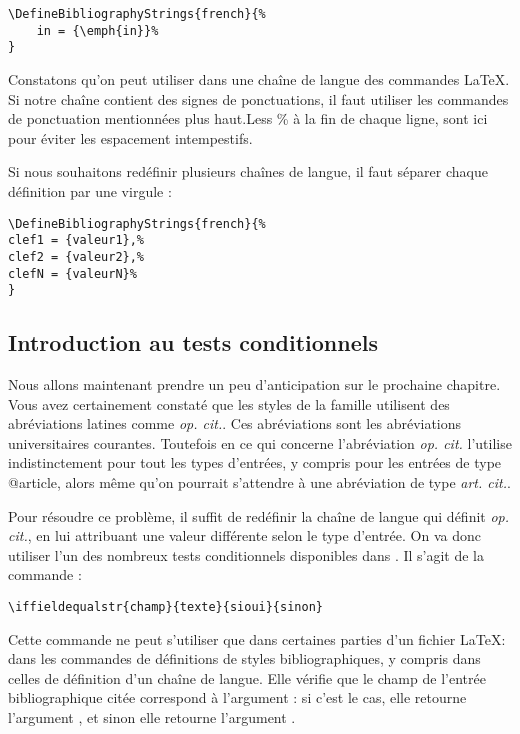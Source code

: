 	\begin{verbatim}
\DefineBibliographyStrings{french}{%
	in = {\emph{in}}%
}
	\end{verbatim}
	
	Constatons qu'on peut utiliser dans une chaîne de langue des commandes \LaTeX. Si notre chaîne contient des signes de ponctuations, il faut utiliser les commandes de ponctuation mentionnées plus haut.Less \% à la fin de chaque ligne, sont ici pour éviter les espacement intempestifs.
	
	Si nous souhaitons redéfinir plusieurs chaînes de langue, il faut séparer chaque définition par une virgule :
	
	\begin{verbatim}
\DefineBibliographyStrings{french}{%
clef1 = {valeur1},%
clef2 = {valeur2},%
clefN = {valeurN}%
}
	\end{verbatim}
	
\subsection{Introduction au tests conditionnels}\label{opcit}

Nous allons maintenant prendre un peu d'anticipation sur le prochaine chapitre.
Vous avez certainement constaté que les styles de la famille  utilisent des abréviations latines comme \emph{op. cit.}.
Ces abréviations sont les abréviations universitaires courantes. Toutefois en ce qui concerne l'abréviation \emph{op. cit.}  l'utilise indistinctement pour tout les types d'entrées, y compris pour les entrées de type @article, alors même qu'on pourrait s'attendre à une abréviation de type \emph{art. cit.}.

Pour résoudre ce problème, il suffit de redéfinir la chaîne de langue qui définit \emph{op. cit.}, en lui attribuant une valeur différente selon le type d'entrée.  On va donc utiliser l'un des nombreux tests conditionnels disponibles dans . Il s'agit de la commande :

\begin{verbatim}
\iffieldequalstr{champ}{texte}{sioui}{sinon}
\end{verbatim}

Cette commande ne peut s'utiliser que dans certaines parties d'un fichier \LaTeX : dans les commandes de définitions de styles bibliographiques, y compris dans celles de définition d'un chaîne de langue. 
Elle vérifie que le champ 	de l'entrée bibliographique citée correspond à l'argument  : si c'est le cas, elle retourne l'argument , et sinon elle retourne l'argument .

